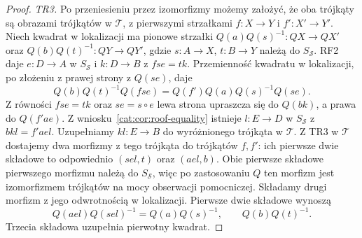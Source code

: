 \begin{proof}
\emph{TR3.} Po przeniesieniu przez izomorfizmy możemy założyć, że oba trójkąty są obrazami trójkątów w $\mathcal T$, z pierwszymi strzałkami $f:X\to Y$ i $f':X'\to Y'$. Niech kwadrat w lokalizacji ma pionowe strzałki $Q(a)Q(s)^{-1}:QX\to QX'$ oraz $Q(b)Q(t)^{-1}:QY\to QY'$, gdzie $s:A\to X$, $t:B\to Y$ należą do $S_{\mathcal S}$. RF2 daje $e:D\to A$ w $S_{\mathcal S}$ i $k:D\to B$ z $fse=tk$. Przemienność kwadratu w lokalizacji, po złożeniu z prawej strony z $Q(se)$, daje
\[
 Q(b)Q(t)^{-1}Q(fse)=Q(f')Q(a)Q(s)^{-1}Q(se).
\]
Z równości $fse=tk$ oraz $se=s\circ e$ lewa strona upraszcza się do $Q(bk)$, a prawa do $Q(f'ae)$.
Z wniosku~\ref{cat:cor:roof-equality} istnieje $l:E\to D$ w $S_{\mathcal S}$ z $bkl=f'ael$. Uzupełniamy $kl:E\to B$ do wyróżnionego trójkąta w $\mathcal T$. Z TR3 w $\mathcal T$ dostajemy dwa morfizmy z tego trójkąta do trójkątów $f,f'$: ich pierwsze dwie składowe to odpowiednio $(sel,t)$ oraz $(ael,b)$. Obie pierwsze składowe pierwszego morfizmu należą do $S_{\mathcal S}$, więc po zastosowaniu $Q$ ten morfizm jest izomorfizmem trójkątów na mocy obserwacji pomocniczej. Składamy drugi morfizm z jego odwrotnością w lokalizacji. Pierwsze dwie składowe wynoszą
\[
 Q(ael)Q(sel)^{-1}=Q(a)Q(s)^{-1},\qquad Q(b)Q(t)^{-1}.
\]
Trzecia składowa uzupełnia pierwotny kwadrat.


\end{proof}
